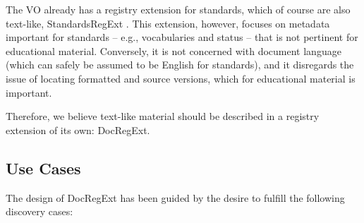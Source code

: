 \documentclass{ivoa}
\begin{document}
The VO already has a registry extension for standards, which of
course are also text-like, StandardsRegExt \citep{2012ivoa.spec.0508H}.  This extension,
however, focuses on metadata important for standards – e.g.,
vocabularies and status – that is not pertinent for educational
material.  Conversely, it is not concerned with document language (which
can safely be assumed to be English for standards), and it disregards
the issue of locating formatted and source versions, which for educational
material is important.  

Therefore, we believe text-like material should be described in a 
registry extension of its own: DocRegExt.


\subsection{Use Cases}

\label{sect:regext-usecases}

The design of DocRegExt has been guided by the desire to fulfill the
following discovery cases:
\end{document}
